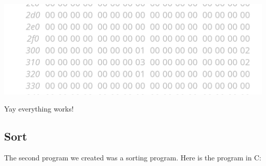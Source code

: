 \documentclass{article}
\begin{document}
\begin{center}
    \includegraphics[scale=.5]{palMem2.png} 
\end{center}
Yay everything works!

\subsection{Sort}
The second program we created was a sorting program. Here is the program in C:
\end{document}
